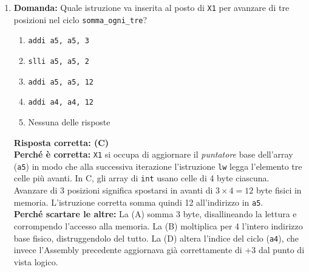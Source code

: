 \documentclass[12pt, a4paper]{article}
\begin{document}
\begin{enumerate}
    \item \textbf{Domanda:} Quale istruzione va inserita al posto di \texttt{X1} per avanzare di tre posizioni nel ciclo \texttt{somma\_ogni\_tre}?
    \begin{enumerate}[label=(\Alph*)]
        \item \texttt{addi a5, a5, 3}
        \item \texttt{slli a5, a5, 2}
        \item \texttt{addi a5, a5, 12}
        \item \texttt{addi a4, a4, 12}
        \item Nessuna delle risposte
    \end{enumerate}
    \textbf{Risposta corretta: (C)} \\
    \textbf{Perché è corretta:} \texttt{X1} si occupa di aggiornare il \textit{puntatore} base dell'array (\texttt{a5}) in modo che alla successiva iterazione l'istruzione \texttt{lw} legga l'elemento tre celle più avanti. In C, gli array di \texttt{int} usano celle di 4 byte ciascuna. Avanzare di 3 posizioni significa spostarsi in avanti di $3 \times 4 = 12$ byte fisici in memoria. L'istruzione corretta somma quindi 12 all'indirizzo in \texttt{a5}. \\
    \textbf{Perché scartare le altre:} La (A) somma 3 byte, disallineando la lettura e corrompendo l'accesso alla memoria. La (B) moltiplica per 4 l'intero indirizzo base fisico, distruggendolo del tutto. La (D) altera l'indice del ciclo (\texttt{a4}), che invece l'Assembly precedente aggiornava già correttamente di +3 dal punto di vista logico.


\end{enumerate}
\end{document}

